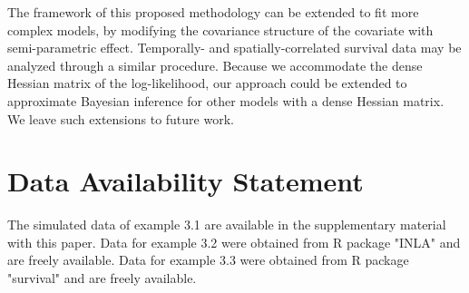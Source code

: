 \documentclass[ba]{imsart}
\begin{document}
The framework of this proposed methodology can be extended to fit more complex models, by modifying the covariance structure of the covariate with semi-parametric effect. Temporally- and spatially-correlated survival data may be analyzed through a similar procedure. Because we accommodate the dense Hessian matrix of the log-likelihood, our approach could be extended to approximate Bayesian inference for other models with a dense Hessian matrix. We leave such extensions to future work.

\section*{Data Availability Statement}
The simulated data of example 3.1 are available in the supplementary material with this paper. Data for example 3.2 were obtained from R package "INLA" \citep{inla} and are freely available.
Data for example 3.3 were obtained from R package "survival" \citep{survival-package} and are freely available. 


\nocite{*}%

%

\clearpage

\begin{table}
\begin{center}
\end{center}
\caption{Comparison metrics in terms of MSE and posterior coverage rate from 300 independent replications, for the fixed effect parameter in the first simulation study in section \ref{subsubsec:sim1}.}
\label{table:Sim1AggFixed}
\end{table}
\end{document}
